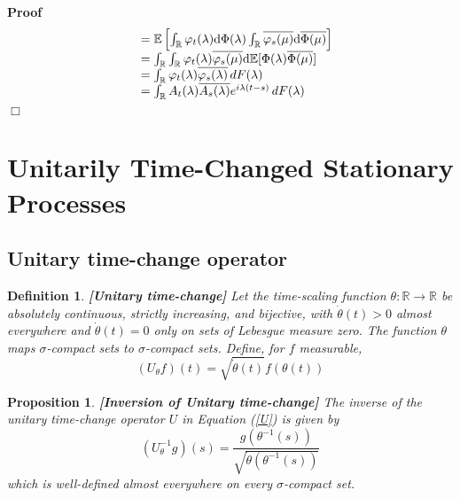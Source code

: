 \documentclass{article}
\newcommand{\mathd}{\mathrm{d}}
\newcommand{\tmstrong}[1]{\textbf{#1}}
\newenvironment{proof}{\noindent\textbf{Proof\ }}{\hspace*{\fill}$\Box$\medskip}
\newtheorem{definition}{Definition}
\newtheorem{proposition}{Proposition}
{\theorembodyfont{\rmfamily}\newtheorem{remark}{Remark}}
\begin{document}
\begin{proof}
\begin{equation}
\begin{array}{ll}
      & =\mathbb{E} \left[ \int_{\mathbb{R}} \varphi_t (\lambda) \mathd \Phi
      (\lambda) \int_{\mathbb{R}} \overline{\varphi_s (\mu)} \mathd
      \overline{\Phi (\mu)} \right]\\
      & = \int_{\mathbb{R}} \int_{\mathbb{R}} \varphi_t (\lambda)
      \overline{\varphi_s (\mu)} \mathd \mathbb{E} [\Phi (\lambda)
      \overline{\Phi (\mu)}]\\
      & = \int_{\mathbb{R}} \varphi_t (\lambda) \overline{\varphi_s
      (\lambda)} \hspace{0.17em} dF (\lambda)\\
      & = \int_{\mathbb{R}} A_t (\lambda) \overline{A_s (\lambda)} e^{i
      \lambda (t - s)}  \hspace{0.17em} dF (\lambda)
    \end{array}
  \end{equation}
\end{proof}

\section{Unitarily Time-Changed Stationary
Processes}\label{sec:stationary_timechange}

\subsection{Unitary time-change operator}

\begin{definition}
  {\tmstrong{[Unitary time-change]\label{def:Utheta}}} Let the time-scaling
  function $\theta : \mathbb{R} \to \mathbb{R}$ be absolutely continuous,
  strictly increasing, and bijective, with $\dot{\theta} (t) > 0$ almost
  everywhere and $\dot{\theta} (t) = 0$ only on sets of Lebesgue measure zero.
  The function $\theta$ maps $\sigma$-compact sets to $\sigma$-compact sets.
  Define, for $f$ measurable,
  \begin{equation}
    (U_{\theta} f) (t) = \sqrt{\dot{\theta} (t)} f (\theta (t)) \label{U}
  \end{equation}
\end{definition}

\begin{proposition}
  {\tmstrong{[Inversion of Unitary time-change]\label{prop:inverse} }}The
  inverse of the unitary time-change operator $U$ in Equation (\ref{U}) is
  given by
  \begin{equation}
    (U_{\theta}^{- 1} g) (s) = \frac{g (\theta^{- 1} (s))}{\sqrt{\dot{\theta}
    (\theta^{- 1} (s))}}
  \end{equation}
  which is well-defined almost everywhere on every $\sigma$-compact set.
\end{proposition}
\end{document}
